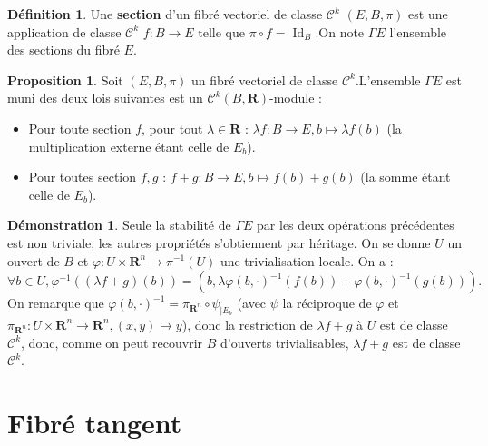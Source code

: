 \documentclass[12pt,a4paper]{article}
\DeclareMathOperator{\Id}{Id}
\theoremstyle{definition}
\newtheorem{prop}[thm]{Proposition}
\newtheorem{defn}[thm]{Définition}
\newtheorem*{dem}{Démonstration}
\begin{document}
\begin{defn}
Une \textbf{section} d'un fibré vectoriel de classe $\mathcal{C}^k$ $(E,B,\pi)$ est une application de classe $\mathcal{C}^k$ $f:B\to E$ telle que $\pi\circ f=\Id_B$.\newline On note $\Gamma E$ l'ensemble des sections du fibré $E$.
\end{defn}
\begin{prop}
Soit $(E,B,\pi)$ un fibré vectoriel de classe $\mathcal{C}^k$.\newline L'ensemble $\Gamma E$ est muni des deux lois suivantes est un $\mathcal{C}^k(B,\mathbf{R})$-module :
\begin{itemize}
\item Pour toute section $f$, pour tout $\lambda\in\mathbf{R}$ : $\lambda f: B\to E, b\mapsto \lambda f(b)$ (la multiplication externe étant celle de $E_b$).
\item Pour toutes section $f,g$ : $f+g:B\to E, b\mapsto f(b)+g(b)$ (la somme étant celle de $E_b$).
\end{itemize}
\end{prop}
\begin{dem}
Seule la stabilité de $\Gamma E$ par les deux opérations précédentes est non triviale, les autres propriétés s'obtiennent par héritage.\newline
On se donne $U$ un ouvert de $B$ et $\varphi:U\times\mathbf{R}^n\to \pi^{-1}(U)$ une trivialisation locale. On a : $$\forall b\in U, \varphi^{-1}((\lambda f+g)(b))=(b,\lambda\varphi(b,\cdot)^{-1}(f(b))+\varphi(b,\cdot)^{-1}(g(b))).$$
On remarque que $\varphi(b,\cdot)^{-1}=\pi_{\mathbf{R}^n}\circ\psi_{|E_b}$ (avec $\psi$ la réciproque de $\varphi$ et\newline $\pi_{\mathbf{R}^n}:U\times\mathbf{R}^n\to\mathbf{R}^n,(x,y)\mapsto y$), donc la restriction de $\lambda f+g$ à $U$ est de classe $\mathcal{C}^k$, donc, comme on peut recouvrir $B$ d'ouverts trivialisables, $\lambda f+g$ est de classe $\mathcal{C}^k$.
\end{dem}
\newpage
\section{Fibré tangent}
\end{document}
